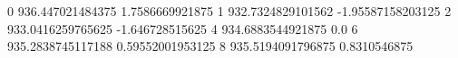 0 936.447021484375 1.7586669921875
1 932.7324829101562 -1.95587158203125
2 933.0416259765625 -1.646728515625
4 934.6883544921875 0.0
6 935.2838745117188 0.59552001953125
8 935.5194091796875 0.8310546875
